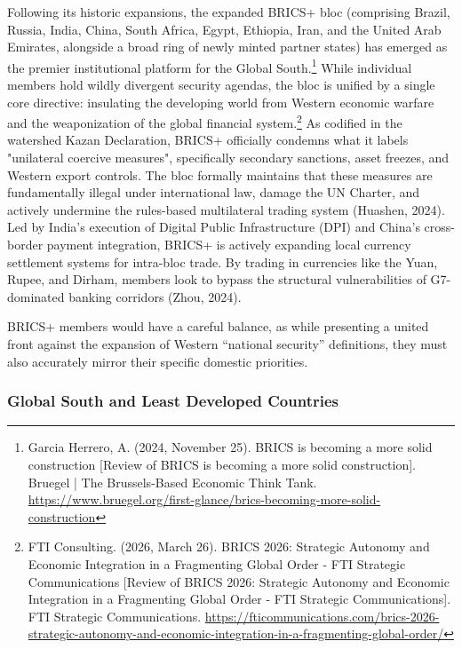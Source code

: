 Following its historic expansions, the expanded BRICS+ bloc (comprising Brazil, Russia, India, China, South Africa, Egypt, Ethiopia, Iran, and the United Arab Emirates, alongside a broad ring of newly minted partner states) has emerged as the premier institutional platform for the Global South.\footnote{Garcia Herrero, A. (2024, November 25). BRICS is becoming a more solid construction [Review of BRICS is becoming a more solid construction]. Bruegel | The Brussels-Based Economic Think Tank. \url{https://www.bruegel.org/first-glance/brics-becoming-more-solid-construction}} While individual members hold wildly divergent security agendas, the bloc is unified by a single core directive: insulating the developing world from Western economic warfare and the weaponization of the global financial system.\footnote{FTI Consulting. (2026, March 26). BRICS 2026: Strategic Autonomy and Economic Integration in a Fragmenting Global Order - FTI Strategic Communications [Review of BRICS 2026: Strategic Autonomy and Economic Integration in a Fragmenting Global Order - FTI Strategic Communications]. FTI Strategic Communications. \url{https://fticommunications.com/brics-2026-strategic-autonomy-and-economic-integration-in-a-fragmenting-global-order/}} As codified in the watershed Kazan Declaration, BRICS+ officially condemns what it labels "unilateral coercive measures", specifically secondary sanctions, asset freezes, and Western export controls. The bloc formally maintains that these measures are fundamentally illegal under international law, damage the UN Charter, and actively undermine the rules-based multilateral trading system (Huashen, 2024). Led by India’s execution of Digital Public Infrastructure (DPI) and China’s cross-border payment integration, BRICS+ is actively expanding local currency settlement systems for intra-bloc trade. By trading in currencies like the Yuan, Rupee, and Dirham, members look to bypass the structural vulnerabilities of G7-dominated banking corridors (Zhou, 2024).

BRICS+ members would have a careful balance, as while presenting a united front against the expansion of Western “national security” definitions, they must also accurately mirror their specific domestic priorities.

\subsubsection{Global South and Least Developed Countries}

